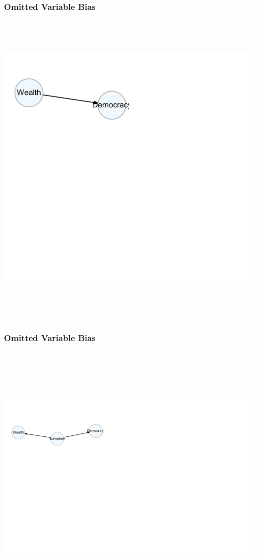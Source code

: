\documentclass[xcolor=x11names,compress]{beamer}\usepackage[]{graphicx}\usepackage[]{color}
\newenvironment{knitrout}{}{} %
\renewcommand{\(}{\begin{columns}}
\renewcommand{\)}{\end{columns}}
\newcommand{\<}[1]{\begin{column}{#1}}
\renewcommand{\>}{\end{column}}
\begin{document}
\begin{frame}
\frametitle{Omitted Variable Bias}
\begin{knitrout}
\color{fgcolor}

{\centering \includegraphics[width=600,height=600]{figure/unnamed-chunk-1-1} 

}



\end{knitrout}
\end{frame}

\begin{frame}
\frametitle{Omitted Variable Bias}
\begin{knitrout}
\color{fgcolor}

{\centering \includegraphics[width=800,height=500]{figure/unnamed-chunk-2-1} 

}



\end{knitrout}
\end{frame}
\end{document}
